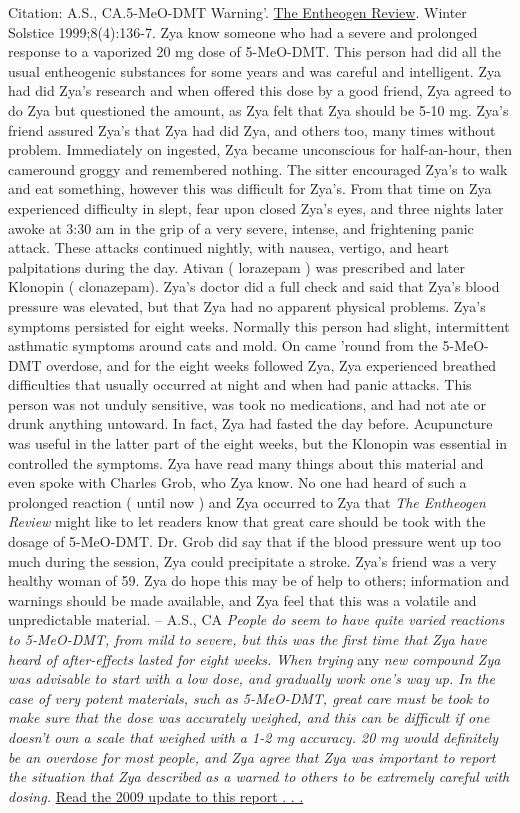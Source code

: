 \documentclass[12pt]{book}
\begin{document}
Citation: A.S., CA.5-MeO-DMT Warning'. \underline{The Entheogen Review}. Winter Solstice 1999;8(4):136-7. Zya know someone who had a severe and prolonged response to a vaporized 20 mg dose of 5-MeO-DMT. This person had did all the usual entheogenic substances for some years and was careful and intelligent. Zya had did Zya's research and when offered this dose by a good friend, Zya agreed to do Zya but questioned the amount, as Zya felt that Zya should be 5-10 mg. Zya's friend assured Zya's that Zya had did Zya, and others too, many times without problem. Immediately on ingested, Zya became unconscious for half-an-hour, then cameround groggy and remembered nothing. The sitter encouraged Zya's to walk and eat something, however this was difficult for Zya's. From that time on Zya experienced difficulty in slept, fear upon closed Zya's eyes, and three nights later awoke at 3:30 am in the grip of a very severe, intense, and frightening panic attack. These attacks continued nightly, with nausea, vertigo, and heart palpitations during the day. Ativan ( lorazepam ) was prescribed and later Klonopin ( clonazepam). Zya's doctor did a full check and said that Zya's blood pressure was elevated, but that Zya had no apparent physical problems. Zya's symptoms persisted for eight weeks. Normally this person had slight, intermittent asthmatic symptoms around cats and mold. On came 'round from the 5-MeO-DMT overdose, and for the eight weeks followed Zya, Zya experienced breathed difficulties that usually occurred at night and when had panic attacks. This person was not unduly sensitive, was took no medications, and had not ate or drunk anything untoward. In fact, Zya had fasted the day before. Acupuncture was useful in the latter part of the eight weeks, but the Klonopin was essential in controlled the symptoms. Zya have read many things about this material and even spoke with Charles Grob, who Zya know. No one had heard of such a prolonged reaction ( until now ) and Zya occurred to Zya that \emph{The Entheogen Review} might like to let readers know that great care should be took with the dosage of 5-MeO-DMT. Dr. Grob did say that if the blood pressure went up too much during the session, Zya could precipitate a stroke. Zya's friend was a very healthy woman of 59. Zya do hope this may be of help to others; information and warnings should be made available, and Zya feel that this was a volatile and unpredictable material. -- A.S., CA \emph{People do seem to have quite varied reactions to 5-MeO-DMT, from mild to severe, but this was the first time that Zya have heard of after-effects lasted for eight weeks. When trying} any \emph{new compound Zya was advisable to start with a low dose, and gradually work one's way up. In the case of very potent materials, such as 5-MeO-DMT, great care must be took to make sure that the dose was accurately weighed, and this can be difficult if one doesn't own a scale that weighed with a 1-2 mg accuracy. 20 mg would definitely be an overdose for most people, and Zya agree that Zya was important to report the situation that Zya described as a warned to others to be extremely careful with dosing.} \href{http://www.government.org/experiences/exp.php?ID=79607}{Read the 2009 update to this report . . .  }
\end{document}
